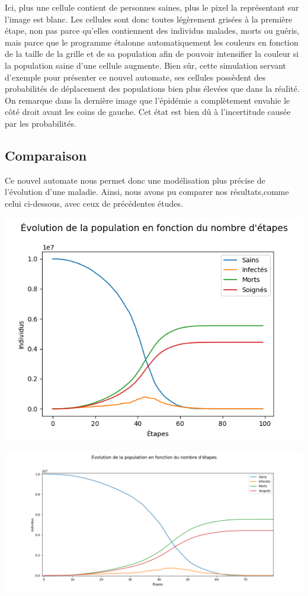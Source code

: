 \documentclass{article}
\begin{document}
Ici, plus une cellule contient de personnes saines, plus le pixel la représentant sur l'image est blanc. Les cellules sont donc toutes légèrement grisées à la première étape, non pas parce qu'elles contiennent des individus malades, morts ou guéris, mais parce que le programme étalonne automatiquement les couleurs en fonction de la taille de la grille et de sa population afin de pouvoir intensifier la couleur si la population saine d'une cellule augmente.
Bien sûr, cette simulation servant d'exemple pour présenter ce nouvel automate, ses cellules possèdent des probabilités de déplacement des populations bien plus élevées que dans la réalité.
On remarque dans la dernière image que l'épidémie a complètement envahie le côté droit avant les coins de gauche. Cet état est bien dû à l'incertitude causée par les probabilités.
 \subsection{Comparaison}
Ce nouvel automate nous permet donc une modélisation plus précise de l'évolution d'une maladie. Ainsi, nous avons pu comparer nos résultats,comme celui ci-dessous, avec ceux de précédentes études.

\includegraphics[scale=1]{../images/tttt.png}

\includegraphics[scale=0.5]{../images/tttttttttt.png}   
\end{document}
